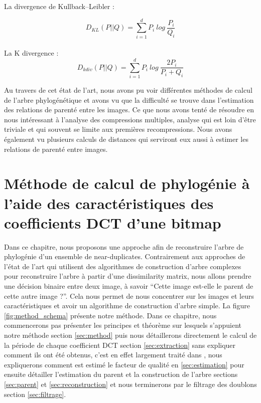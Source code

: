 \documentclass[utf8,final]{stageM2R} %
\begin{document}
La divergence de Kullback–Leibler :%

\begin{equation}
  D_{KL}(P||Q) = \sum\limits_{i=1}^{d} P_{i}\ log\ \frac{P_{i}}{Q_{i}}
\end{equation}
\\
La K divergence : 
\begin{equation}
  D_{kdiv}(P||Q) = \sum\limits_{i=1}^{d} P_{i}\ log\ \frac{2P_{i}}{P_{i}+Q_{i}}
\end{equation}

\vspace{8mm}
Au travers de cet état de l'art, nous avons pu voir différentes méthodes de calcul de l'arbre phylogénétique et avons vu que la difficulté se trouve dans l'estimation des relations de parenté entre les images. Ce que nous avons tenté de résoudre en nous intéressant à l'analyse des compressions multiples, analyse qui est loin d'être triviale et qui souvent se limite aux premières recompressions. Nous avons également vu plusieurs calculs de distances qui serviront eux aussi à estimer les relations de parenté entre images.

\chapter{Méthode de calcul de phylogénie à l'aide des caractéristiques des coefficients DCT d'une bitmap}
\label{chap3}

Dans ce chapitre, nous proposons une approche afin de reconstruire l'arbre de phylogénie d'un ensemble de near-duplicates. Contrairement aux approches de l'état de l'art qui utilisent des algorithmes de construction d'arbre complexes pour reconstruire l'arbre à partir d'une dissimilarity matrix, nous allons prendre une décision binaire entre deux image, à savoir ``Cette image est-elle le parent de cette autre image ?''. Cela nous permet de nous concentrer sur les images et leurs caractéristiques et avoir un algorithme de construction d'arbre simple. La figure \ref{fig:method_schema} présente notre méthode. Dans ce chapitre, nous commencerons pas présenter les principes et théorème sur lesquels s'appuient notre méthode section \ref{sec:method} puis nous détaillerons directement le calcul de la période de chaque coefficient DCT section \ref{sec:extraction} sans expliquer comment ils ont été obtenus, c'est en effet largement traité dans \autocite{wallace1992jpeg}, nous expliquerons comment est estimé le facteur de qualité en \ref{sec:estimation} pour ensuite détailler l'estimation du parent et la construction de l'arbre sections \ref{sec:parent} et \ref{sec:reconstruction} et nous terminerons par le filtrage des doublons section \ref{sec:filtrage}.
\end{document}
